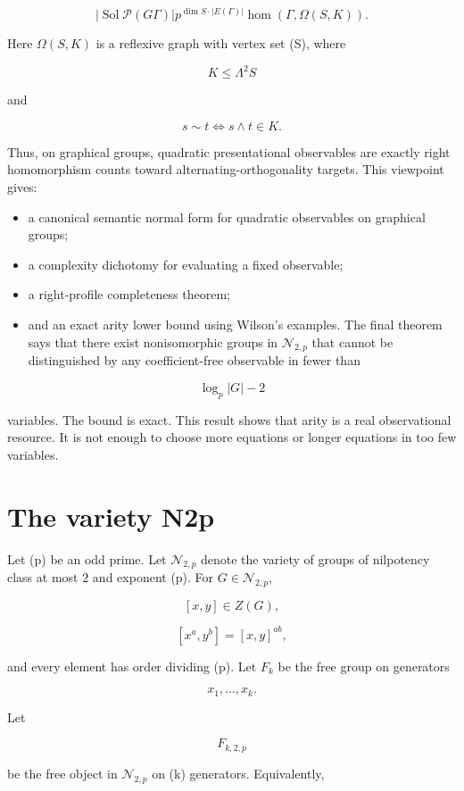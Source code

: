 \documentclass[11pt]{article}
\begin{document}
\[
|\operatorname{Sol}
{\mathcal P}(G
\Gamma)|
p^{\dim S\cdot |E(\Gamma)|}
\operatorname{hom}(\Gamma,\Omega(S,K)).
\]

Here $\Omega(S,K)$ is a reflexive graph with vertex set (S), where

\[
K\le \Lambda^2S
\]

and

\[
s\sim t
\iff s\wedge t\in K.
\]

Thus, on graphical groups, quadratic presentational observables are exactly right homomorphism counts toward alternating-orthogonality targets. This viewpoint gives:

\begin{itemize}
\item a canonical semantic normal form for quadratic observables on graphical groups;
\item a complexity dichotomy for evaluating a fixed observable;
\item a right-profile completeness theorem;
\item and an exact arity lower bound using Wilson's examples.
The final theorem says that there exist nonisomorphic groups in $\mathcal N_{2,p}$ that cannot be distinguished by any coefficient-free observable in fewer than

\end{itemize}

\[
\log_p|G|-2
\]

variables. The bound is exact. This result shows that arity is a real observational resource. It is not enough to choose more equations or longer equations in too few variables.

\section{The variety N2p}

Let (p) be an odd prime. Let $\mathcal N_{2,p}$ denote the variety of groups of nilpotency class at most $2$ and exponent (p). For $G\in\mathcal N_{2,p}$,

\[
[x,y]\in Z(G),
\]

\[
[x^a,y^b]=[x,y]^{ab},
\]

and every element has order dividing (p). Let $F_k$ be the free group on generators

\[
x_1,\dots,x_k.
\]

Let

\[
F_{k,2,p}
\]

be the free object in $\mathcal N_{2,p}$ on (k) generators. Equivalently,
\end{document}
